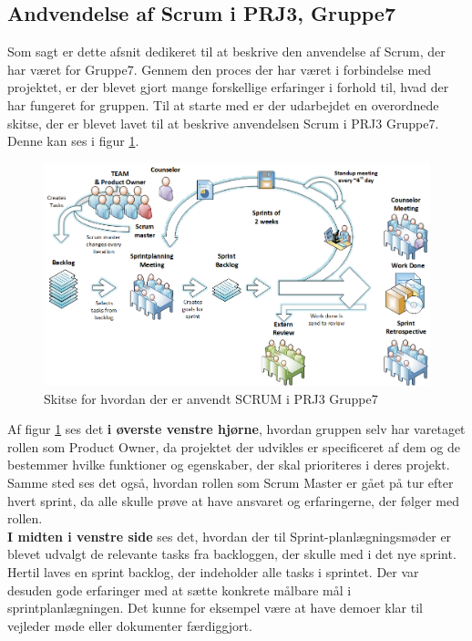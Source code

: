 \documentclass[Rapport/Rapport_main.tex]{subfiles}
\begin{document}
\subsection{Andvendelse af Scrum i PRJ3, Gruppe7}
Som sagt er dette afsnit dedikeret til at beskrive den anvendelse af Scrum, der har været for Gruppe7. Gennem den proces der har været i forbindelse med projektet, er der blevet gjort mange forskellige erfaringer i forhold til, hvad der har fungeret for gruppen. Til at starte med er der udarbejdet en overordnede skitse, der er blevet lavet til at beskrive anvendelsen Scrum i PRJ3 Gruppe7. Denne kan ses i figur \ref{fig:rap_scrum_usage}.
\begin{figure}[H]
    \centering
    \includegraphics[width=\textwidth]{Processdokument/graphics/Scrum_usage.png}
    \caption{Skitse for hvordan der er anvendt SCRUM i PRJ3 Gruppe7}
    \label{fig:rap_scrum_usage}
\end{figure}
Af figur \ref{fig:rap_scrum_usage} ses det \textbf{i øverste venstre hjørne}, hvordan gruppen selv har varetaget rollen som Product Owner, da projektet der udvikles er specificeret af dem og de bestemmer hvilke funktioner og egenskaber, der skal prioriteres i deres projekt. Samme sted ses det også, hvordan rollen som Scrum Master er gået på tur efter hvert sprint, da alle skulle prøve at have ansvaret og erfaringerne, der følger med rollen.\\
\textbf{I midten i venstre side} ses det, hvordan der til Sprint-planlægningsmøder er blevet udvalgt de relevante tasks fra backloggen, der skulle med i det nye sprint. Hertil laves en sprint backlog, der indeholder alle tasks i sprintet. Der var desuden gode erfaringer med at sætte konkrete målbare mål i sprintplanlægningen. Det kunne for eksempel være at have demoer klar til vejleder møde eller dokumenter færdiggjort.\\
\end{document}
